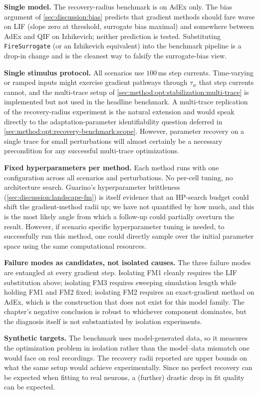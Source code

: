 \textbf{Single model.}
The recovery-radius benchmark is on \gls{AdEx} only.
The bias argument of \cref{sec:discussion:bias} predicts that gradient methods should fare worse on \gls{LIF} (slope zero at threshold, surrogate bias maximal) and somewhere between \gls{AdEx} and \gls{QIF} on Izhikevich; neither prediction is tested.
Substituting \texttt{FireSurrogate} (or an Izhikevich equivalent) into the benchmark pipeline is a drop-in change and is the cleanest way to falsify the surrogate-bias view.

\textbf{Single stimulus protocol.}
All scenarios use $100$\,ms step currents.
Time-varying or ramped inputs might exercise gradient pathways through $\tau_w$ that step currents cannot, and the multi-trace setup of \cref{sec:method:opt:stabilization:multi-trace} is implemented but not used in the headline benchmark.
A multi-trace replication of the recovery-radius experiment is the natural extension and would speak directly to the adaptation-parameter identifiability question deferred in \cref{sec:method:opt:recovery-benchmark:scope}.
However, parameter recovery on a single trace for small perturbations will almost certainly be a necessary precondition for any successful multi-trace optimizations.

\textbf{Fixed hyperparameters per method.}
Each method runs with one configuration across all scenarios and perturbations.
No per-cell tuning, no architecture search.
Guarino's hyperparameter brittleness (\cref{sec:discussion:landscape-fm}) is itself evidence that an \gls{HP}-search budget could shift the gradient-method radii up;
we have not quantified by how much, and this is the most likely angle from which a follow-up could partially overturn the result.
However, if scenario specific hyperparameter tuning is needed, to successfully run this method, one could directly sample over the initial parameter space using the same computational resources.

\textbf{Failure modes as candidates, not isolated causes.}
The three failure modes are entangled at every gradient step.
Isolating FM1 cleanly requires the LIF substitution above;
isolating FM3 requires sweeping simulation length while holding FM1 and FM2 fixed;
isolating FM2 requires an exact-gradient method on \gls{AdEx}, which is the construction that does not exist for this model family.
The chapter's negative conclusion is robust to whichever component dominates, but the diagnosis itself is not substantiated by isolation experiments.

\textbf{Synthetic targets.}
The benchmark uses model-generated data, so it measures the optimization problem in isolation rather than the model--data mismatch one would face on real recordings.
The recovery radii reported are upper bounds on what the same setup would achieve experimentally.
Since no perfect recovery can be expected when fitting to real neurons, a (further) drastic drop in fit quality can be expected.
